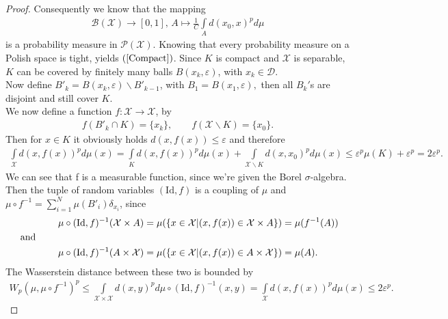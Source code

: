 \documentclass[11pt,a4paper]{article}
\begin{document}
\begin{proof}
Consequently we know that the mapping 
\begin{align*}
\mathcal{B(X)}\longrightarrow{}[0,1],\,A\mapsto\frac{1}{C}\int\limits_{A}d(x_0,x)^pd\mu
\end{align*}
is a probability measure in $\mathcal{P(X)}$. Knowing that every probability measure on a Polish space is tight, yields $(\ref{Compact})$.
Since $K$ is compact and $\mathcal{X}$ is separable, $K$ can be covered by finitely many balls $B(x_k,\varepsilon)$, with $x_k\in\mathcal{D}.$\vspace{1em}\\
Now define $B'_k = B(x_k,\varepsilon)\backslash{}B'_{k-1}$, with $B_1=B(x_1,\varepsilon),$ then all $B_k'$s are disjoint and still cover $K$.\vspace{1em}\\
We now define a function $f:\mathcal{X}\rightarrow\mathcal{X}$, by
\begin{align*}
f(B'_k\cap{}K)=\{x_k\},\qquad f(\mathcal{X}\backslash{}K)=\{x_0\}.
\end{align*}
Then for $x\in{}K$ it obviously holds $d(x,f(x))\leq\varepsilon$ and therefore
\begin{align*}
\int\limits_{\mathcal{X}}d(x,f(x))^pd\mu(x) = \int\limits_{K}d(x,f(x))^pd\mu(x) + \int\limits_{\mathcal{X}\backslash{}K}d(x,x_0)^pd\mu(x) \leq \varepsilon^p\mu(K) + \varepsilon^p = 2\varepsilon^p.
\end{align*}
We can see that f is a measurable function, since we're given the Borel $\sigma$-algebra. Then the tuple of random variables $(\text{Id},f)$ is a coupling of $\mu$ and $\mu\circ{}f^{-1} = \sum\limits_{i=1}^{N}\mu(B'_i)\delta_{x_i}$, since 
\begin{align*}
&\mu\circ{}(\text{Id},f)^{-1}(\mathcal{X}\times{}A) = \mu(\{x\in\mathcal{X} | (x,f(x))\in\mathcal{X}\times{}A\}) = \mu(f^{-1}(A))\vspace{0.5em}\\
\text{ and }\quad\quad{}&\vspace{0.5em}\\
&\mu\circ{}(\text{Id},f)^{-1}(A\times\mathcal{X}) = \mu(\lbrace{}x\in\mathcal{X} | (x,f(x))\in{}A\times\mathcal{X}\rbrace{}) = \mu(A).
\end{align*}
The Wasserstein distance between these two is bounded by
\begin{align*}
W_p(\mu,\mu\circ{}f^{-1})^p\leq\int\limits_{\mathcal{X\times{}X}}d(x,y)^pd\mu\circ{}(\text{Id},f)^{-1}(x,y) = \int\limits_{\mathcal{X}}d(x,f(x))^pd\mu(x)\leq{}2\varepsilon^p.
\end{align*} 

\end{proof}
\end{document}
